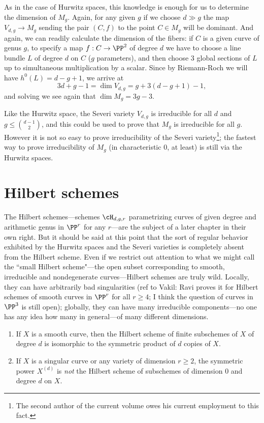 As in the case of Hurwitz spaces, this knowledge is enough for us to determine the dimension of $M_g$. Again, for any given $g$ if we choose $d \gg g$ the map $V_{d,g} \to M_g$ sending the pair $(C, f)$ to the point $C \in M_g$ will be dominant. And again, we can readily calculate the dimension of the fibers: if $C$ is a given curve of genus $g$, to specify a map $f : C \to \PP^2$ of degree $d$ we have to choose a line bundle $L$ of degree $d$ on $C$ ($g$ parameters), and then choose 3 global sections of $L$ up to simultaneous multiplication by a scalar. Since by Riemann-Roch we will have $h^0(L) = d-g+1$, we arrive at
$$
3d+g-1 = \dim V_{d,g}  = g + 3(d-g+1) - 1,
$$
and solving we see again that $\dim M_g = 3g-3$.

Like the Hurwitz space, the Severi variety $V_{d,g}$ is irreducible for all $d$ and $g\leq \binom{d-1}{2}$, and this could be used to prove that $M_g$ is irreducible for all $g$. However it is not so easy to prove irreducibility of the Severi variety\footnote{The second author of the current volume owes his current employment to this fact.}; the fastest way to prove irreducibility of $M_g$ (in characteristic 0, at least) is still via the Hurwitz spaces.

\section{Hilbert schemes}\label{hilbert scheme section}

The Hilbert schemes---schemes $\cH_{d,g,r}$ parametrizing curves of given degree and arithmetic genus in $\PP^r$ for any $r$---are the subject of a later chapter in their own right. But it should be said at this point that the sort of regular behavior exhibited by the Hurwitz spaces and the Severi varieties is completely absent from the Hilbert scheme. Even if we restrict out attention to  what we might call the ``small Hilbert scheme"---the open subset corresponding to smooth, irreducible and nondegenerate curves---Hilbert schemes are truly wild. Locally, they can have arbitrarily bad singularities (ref to Vakil:  Ravi proves it for Hilbert schemes of smooth curves in $\PP^r$ for all $r \geq 4$; I think the question of curves in $\PP^3$ is still open); globally, they can have many irreducible components---no one has any idea how many in general---of many different dimensions.

\begin{exercise}\label{symmetric power vs Hilbert scheme}
\begin{enumerate}
 \item If $X$ is a smooth curve, then the Hilbert scheme of finite subschemes of $X$ of degree $d$ is
 isomorphic to the symmetric product of $d$ copies of $X$.
 \item If $X$ is a singular curve or any variety of dimension $r \geq 2$, the symmetric power $X^{(d)}$ is \emph{not} the Hilbert scheme of subschemes of dimension 0 and degree $d$ on $X$. 
\end{enumerate}
 \end{exercise}

